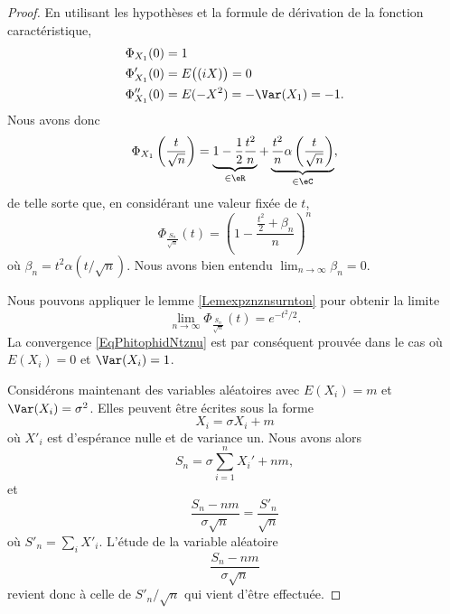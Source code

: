 \begin{proof}
    En utilisant les hypothèses et la formule de dérivation de la fonction caractéristique,
    \begin{subequations}
        \begin{align}
            \Phi_{X_1}(0)&=1\\
            \Phi'_{X_1}(0)&=E\big( (iX) \big)=0\\
            \Phi''_{X_1}(0)&=E(-X^2)=-\Var(X_1)=-1.
        \end{align}
    \end{subequations}
    Nous avons donc
    \begin{equation}
        \Phi_{X_1}\left( \frac{ t }{ \sqrt{n} } \right)=\underbrace{1-\frac{ 1 }{2}\frac{ t^2 }{ n }}_{\in\eR}+\underbrace{\frac{ t^2 }{ n }\alpha\left( \frac{ t }{ \sqrt{n} } \right)}_{\in\eC},
    \end{equation}
    de telle sorte que, en considérant une valeur fixée de \( t\),
    \begin{equation}        \label{EqPhifracfacbetanrigh}
        \Phi_{\frac{ S_n }{ \sqrt{n} }}(t)=\left( 1-\frac{ \frac{ t^2 }{ 2 }+\beta_n }{ n } \right)^n
    \end{equation}
    où \( \beta_n=t^2\alpha(t/\sqrt{n})\). Nous avons bien entendu \( \lim_{n\to \infty} \beta_n=0\).
    
    Nous pouvons appliquer le lemme \ref{Lemexpznznsurnton} pour obtenir la limite
    \begin{equation}        \label{EqlimninfySnsqrtntdsnd}
        \lim_{n\to \infty} \Phi_{\frac{ S_n }{ \sqrt{n} }}(t)= e^{-t^2/2}.
    \end{equation}
    La convergence \eqref{EqPhitophidNtznu} est par conséquent prouvée dans le cas où \( E(X_i)=0\) et $\Var(X_i)=1$.

    Considérons maintenant des variables aléatoires avec \( E(X_i)=m\) et \( \Var(X_i)=\sigma^2\). Elles peuvent être écrites sous la forme
    \begin{equation}
        X_i=\sigma X_i+m
    \end{equation}
    où \( X'_i\) est d'espérance nulle et de variance un. Nous avons alors
    \begin{equation}
        S_n=\sigma\sum_{i=1}^nX_i'+nm,
    \end{equation}
    et
    \begin{equation}
        \frac{ S_n-nm }{ \sigma\sqrt{n} }=\frac{ S'_n }{ \sqrt{n} }
    \end{equation}
    où \( S'_n=\sum_iX'_i\). L'étude de la variable aléatoire 
    \begin{equation}
        \frac{ S_n-nm }{ \sigma\sqrt{n} }
    \end{equation}
    revient donc à celle de \( S'_n/\sqrt{n}\) qui vient d'être effectuée.
\end{proof}


